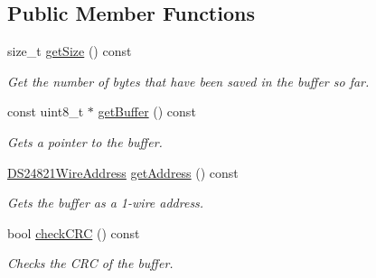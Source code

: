 \subsection*{Public Member Functions}
\begin{DoxyCompactItemize}
\item 
\mbox{\label{class_d_s24821_wire_command_a27e758f6a1de1f23ece963df35531dc5}} 
size\+\_\+t \mbox{\hyperlink{class_d_s24821_wire_command_a27e758f6a1de1f23ece963df35531dc5}{get\+Size}} () const
\begin{DoxyCompactList}\small\item\em Get the number of bytes that have been saved in the buffer so far. \end{DoxyCompactList}\item 
\mbox{\label{class_d_s24821_wire_command_a71e935efbfc8c77e45cd45358fa3396c}} 
const uint8\+\_\+t $\ast$ \mbox{\hyperlink{class_d_s24821_wire_command_a71e935efbfc8c77e45cd45358fa3396c}{get\+Buffer}} () const
\begin{DoxyCompactList}\small\item\em Gets a pointer to the buffer. \end{DoxyCompactList}\item 
\mbox{\hyperlink{class_d_s24821_wire_address}{D\+S24821\+Wire\+Address}} \mbox{\hyperlink{class_d_s24821_wire_command_ab00d3a0b120d3cc33675165d1174aa16}{get\+Address}} () const
\begin{DoxyCompactList}\small\item\em Gets the buffer as a 1-\/wire address. \end{DoxyCompactList}\item 
bool \mbox{\hyperlink{class_d_s24821_wire_command_a721ceae3f65419340b0ea0efa75a37a6}{check\+C\+RC}} () const
\begin{DoxyCompactList}\small\item\em Checks the C\+RC of the buffer. \end{DoxyCompactList}\end{DoxyCompactItemize}
